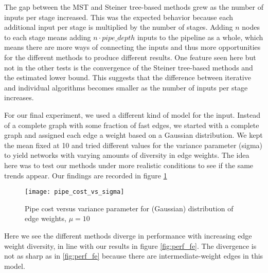 \documentclass[conference]{IEEEtran}
\begin{document}
	 The gap between the MST and Steiner tree-based methods grew as the number of inputs per stage increased. This was the expected behavior because each additional input per stage is multiplied by the number of stages. Adding $n$ nodes to each stage means adding $n \cdot pipe\_depth$ inputs to the pipeline as a whole, which means there are more ways of connecting the inputs and thus more opportunities for the different methods to produce different results. One feature seen here but not in the other tests is the convergence of the Steiner tree-based methods and the estimated lower bound. This suggests that the difference between iterative and individual algorithms becomes smaller as the number of inputs per stage increases.
	 
	 For our final experiment, we used a different kind of model for the input. Instead of a complete graph with some fraction of fast edges, we started with a complete graph and assigned each edge a weight based on a Gaussian distribution.  We kept the mean fixed at 10 and tried different values for the variance parameter (sigma) to yield networks with varying amounts of diversity in edge weights. The idea here was to test our methods under more realistic conditions to see if the same trends appear. Our findings are recorded in figure \ref{fig:perf_rand}
	 \begin{figure}[t]
	     \centering
	     \texttt{[image: pipe\_cost\_vs\_sigma]}
	     \caption{Pipe cost versus variance parameter for (Gaussian) distribution of edge weights, $\mu = 10$}
	     \label{fig:perf_rand}
	 \end{figure}
	 
	Here we see the different methods diverge in performance with increasing edge weight diversity, in line with our results in figure \ref{fig:perf_fe}. The divergence is not as sharp as in \ref{fig:perf_fe} because there are intermediate-weight edges in this model. 
 	
\end{document}
